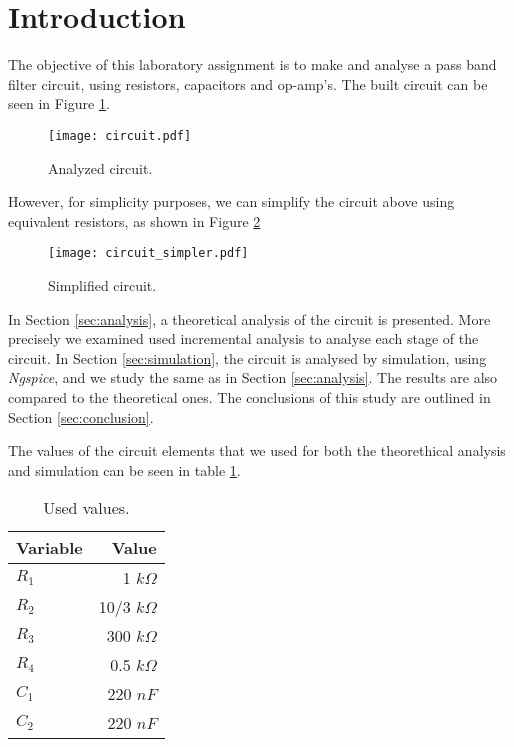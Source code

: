 \section{Introduction}
\label{sec:introduction}

The objective of this laboratory assignment is to make and analyse a pass band filter circuit, using resistors, capacitors and op-amp's. The built circuit can be seen in Figure \ref{fig:cir_intro}.

\begin{figure}[H] \centering
\texttt{[image: circuit.pdf]}
\caption{Analyzed circuit.}
\label{fig:cir_intro}
\end{figure}

However, for simplicity purposes, we can simplify the circuit above using equivalent resistors, as shown in Figure \ref{fig:cir_simpler}

\begin{figure}[H] \centering
\texttt{[image: circuit\_simpler.pdf]}
\caption{Simplified circuit.}
\label{fig:cir_simpler}
\end{figure}

In Section \ref{sec:analysis}, a theoretical analysis of the circuit is
presented. More precisely we examined used incremental analysis to analyse each stage of the circuit.
In Section \ref{sec:simulation}, the circuit is analysed by simulation, using \textit{Ngspice}, and we study the same as in Section \ref{sec:analysis}. The results are also compared to the theoretical ones. The conclusions of this study are outlined in Section \ref{sec:conclusion}.
\par
The values of the circuit elements that we used for both the theorethical analysis and simulation can be seen in table \ref{tab:intro_values}.

\begin{table}[H]
  \centering
  \begin{tabular}{|l|r|}
    \hline
        {\bf Variable} & {\bf Value} \\ \hline
        $R_1$ & 1 $k\Omega$ \\ \hline
        $R_2$ & 10/3 $k\Omega$ \\ \hline
        $R_3$ & 300 $k\Omega$ \\ \hline
        $R_4$ & 0.5 $k\Omega$ \\ \hline
        $C_1$ & 220 $nF$ \\ \hline
        $C_2$ & 220 $nF$ \\ \hline
  \end{tabular}
  \caption{Used values.}
  \label{tab:intro_values}
\end{table}
